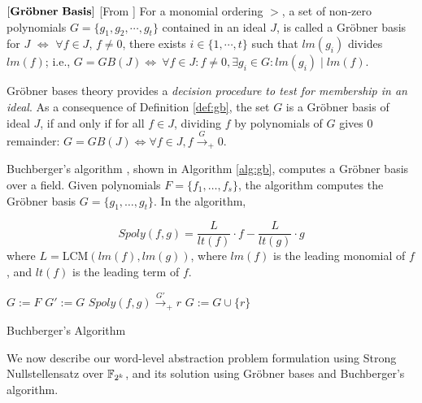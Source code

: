 \begin{Definition} \label{def:gb}
$\bf{\left[Gr\ddot{o}bner\ Basis\right]}$ [From \cite{gb_book}] For
a monomial ordering $>$, a set  of non-zero polynomials $G =
\{g_1,g_2,\cdots,g_t\}$ contained in an ideal $J$, is called a
Gr\"{o}bner basis for $J$ $\iff$ 
$\forall f \in J$, $f\neq 0$, there exists $i \in \{1,\cdots, t\}$ such
that $lm(g_i)$ divides $lm(f)$; i.e., $G = GB(J)
\Leftrightarrow\  \forall f \in J : f \neq 0, \exists g_i \in G :
lm(g_i)\mid lm(f)$. 
\end{Definition}

Gr\"obner bases theory 
provides a {\it decision procedure to test for membership in an
ideal}. As a consequence of Definition \ref{def:gb}, the set $G$ is a
Gr\"obner basis of ideal $J$, if and only if for all $f \in J$,
dividing $f$ by polynomials of $G$ gives  0 remainder:  $G = GB(J)
\iff \forall f\in J, f \stackrel{G}{\textstyle\longrightarrow}_+ 0$. 

Buchberger's algorithm \cite{buchberger_thesis},
shown in Algorithm \ref{alg:gb},  computes a Gr\"obner
basis over a field. Given polynomials $F = \{f_1, \dots, f_s\}$, 
the algorithm computes the Gr\"obner basis $G = \{g_1, \dots, 
g_t\}$.
In the algorithm,  

\begin{equation}
       Spoly(f,g)=\frac{L}{lt(f)}\cdot f - \frac{L}{lt(g)}\cdot g \nonumber
      \label{eqn:spoly}
\end{equation}
where $L = \text{LCM}(lm(f), lm(g))$, where $lm(f)$ is the leading
monomial of $f$, and $lt(f)$ is the leading term of $f$. 


\begin{algorithm}[hbt]
\SetAlgoNoLine
  $G:= F$\;
  {
  	$G' := G$\;
	{
		$Spoly(f, g) \stackrel{G'}{\textstyle\longrightarrow}_+r$ \;
		{
			$G:= G \cup \{r\}$ \;
		}
	}
   }
\caption {Buchberger's Algorithm}\label{alg:gb}
\end{algorithm}

We now describe our word-level abstraction problem formulation using
Strong Nullstellensatz over ${\mathbb{F}}_{2^k}$, and its solution using Gr\"obner
bases and Buchberger's algorithm.

